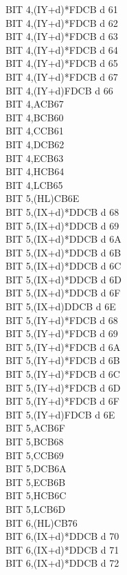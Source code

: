 \documentclass[oneside,a4paper]{book}
\begin{document}
\begin{multicols}{3}
{\begin{tabbing}
BIT 4,(IY+d)*\>FDCB d 61\\
BIT 4,(IY+d)*\>FDCB d 62\\
BIT 4,(IY+d)*\>FDCB d 63\\
BIT 4,(IY+d)*\>FDCB d 64\\
BIT 4,(IY+d)*\>FDCB d 65\\
BIT 4,(IY+d)*\>FDCB d 67\\
BIT 4,(IY+d)\>FDCB d 66\\
BIT 4,A\>CB67\\
BIT 4,B\>CB60\\
BIT 4,C\>CB61\\
BIT 4,D\>CB62\\
BIT 4,E\>CB63\\
BIT 4,H\>CB64\\
BIT 4,L\>CB65\\
BIT 5,(HL)\>CB6E\\
BIT 5,(IX+d)*\>DDCB d 68\\
BIT 5,(IX+d)*\>DDCB d 69\\
BIT 5,(IX+d)*\>DDCB d 6A\\
BIT 5,(IX+d)*\>DDCB d 6B\\
BIT 5,(IX+d)*\>DDCB d 6C\\
BIT 5,(IX+d)*\>DDCB d 6D\\
BIT 5,(IX+d)*\>DDCB d 6F\\
BIT 5,(IX+d)\>DDCB d 6E\\
BIT 5,(IY+d)*\>FDCB d 68\\
BIT 5,(IY+d)*\>FDCB d 69\\
BIT 5,(IY+d)*\>FDCB d 6A\\
BIT 5,(IY+d)*\>FDCB d 6B\\
BIT 5,(IY+d)*\>FDCB d 6C\\
BIT 5,(IY+d)*\>FDCB d 6D\\
BIT 5,(IY+d)*\>FDCB d 6F\\
BIT 5,(IY+d)\>FDCB d 6E\\
BIT 5,A\>CB6F\\
BIT 5,B\>CB68\\
BIT 5,C\>CB69\\
BIT 5,D\>CB6A\\
BIT 5,E\>CB6B\\
BIT 5,H\>CB6C\\
BIT 5,L\>CB6D\\
BIT 6,(HL)\>CB76\\
BIT 6,(IX+d)*\>DDCB d 70\\
BIT 6,(IX+d)*\>DDCB d 71\\
BIT 6,(IX+d)*\>DDCB d 72\\

\end{tabbing}}
\end{multicols}
\end{document}
